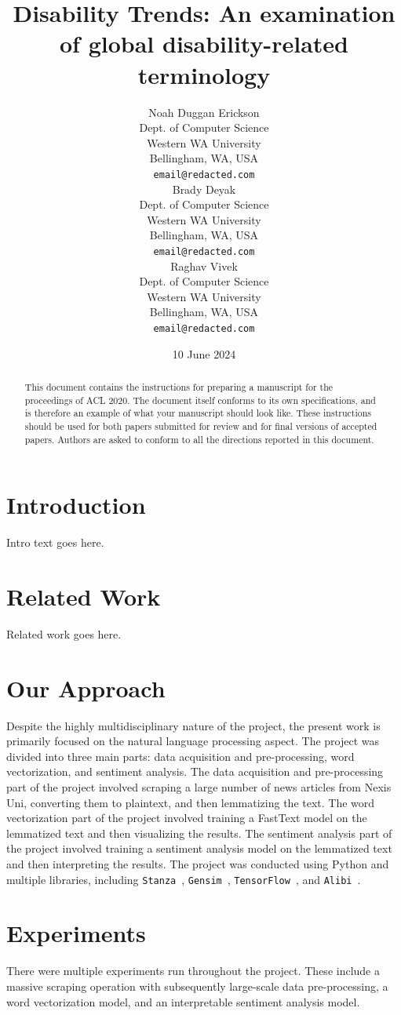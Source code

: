 \documentclass[11pt,a4paper, twocolumn]{article}
\title{Disability Trends: An examination of global disability-related terminology}
\author{Noah Duggan Erickson \\
  Dept. of Computer Science \\
  Western WA University \\
  Bellingham, WA, USA \\
  \texttt{email@redacted.com} \\\And
  Brady Deyak \\
  Dept. of Computer Science \\
  Western WA University \\
  Bellingham, WA, USA \\
  \texttt{email@redacted.com} \\\And
  Raghav Vivek \\
  Dept. of Computer Science \\
  Western WA University \\
  Bellingham, WA, USA \\
  \texttt{email@redacted.com} \\}
\date{10 June 2024}
\begin{document}
\maketitle
\begin{abstract}
This document contains the instructions for preparing a manuscript for the proceedings of ACL 2020.
The document itself conforms to its own specifications, and is therefore an example of what your manuscript should look like.
These instructions should be used for both papers submitted for review and for final versions of accepted papers.
Authors are asked to conform to all the directions reported in this document.
\end{abstract}

\section{Introduction}
Intro text goes here.

\section{Related Work}
Related work goes here.

\section{Our Approach}
Despite the highly multidisciplinary nature of the project, the present work is primarily focused on the natural language processing aspect. The project was divided into three main parts: data acquisition and pre-processing, word vectorization, and sentiment analysis. The data acquisition and pre-processing part of the project involved scraping a large number of news articles from Nexis Uni, converting them to plaintext, and then lemmatizing the text. The word vectorization part of the project involved training a FastText model on the lemmatized text and then visualizing the results. The sentiment analysis part of the project involved training a sentiment analysis model on the lemmatized text and then interpreting the results. The project was conducted using Python and multiple libraries, including \texttt{Stanza}~\citep{stanza}, \texttt{Gensim}~\citep{gensim}, \texttt{TensorFlow}~\citep{tensorflow}, and \texttt{Alibi}~\citep{alibi}.

\section{Experiments}
There were multiple experiments run throughout the project. These include a massive scraping operation with subsequently large-scale data pre-processing, a word vectorization model, and an interpretable sentiment analysis model.
\end{document}

